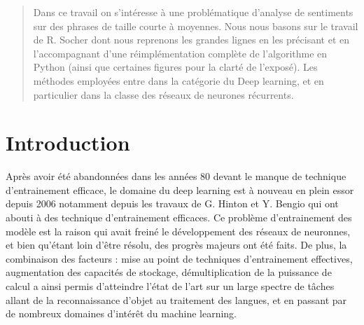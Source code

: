 \documentclass[conference]{IEEEtran}
\begin{document}
\begin{abstract}
Dans ce travail on s'intéresse à une problématique d'analyse de sentiments sur des phrases de taille courte à moyennes. Nous nous basons sur le travail de R. Socher \cite{Socher-etal:2013} dont nous reprenons les grandes lignes en les précisant et en l'accompagnant d'une réimplémentation complète de l'algorithme en Python (ainsi que certaines figures pour la clarté de l'exposé). Les méthodes employées entre dans la catégorie du Deep learning, et en particulier dans la classe des réseaux de neurones récurrents.
\end{abstract}





%
\IEEEpeerreviewmaketitle


\section{Introduction}
Après avoir été abandonnées dans les années 80 devant le manque de technique d'entrainement efficace, le domaine du deep learning est à nouveau en plein essor depuis 2006 notamment depuis les travaux de G. Hinton et Y. Bengio \cite{Hinton:2006:FLA:1161603.1161605,HintonSalakhutdinov2006b,Bengio2007} qui ont abouti à des technique d'entrainement efficaces. Ce problème d'entrainement des modèle est la raison qui avait freiné le développement des réseaux de neuronnes, et bien qu'étant loin d'être résolu, des progrès majeurs ont été faits. De plus, la combinaison des facteurs : mise au point de techniques d'entrainement effectives, augmentation des capacités de stockage, démultiplication de la puissance de calcul a ainsi permis d'atteindre l'état de l'art sur un large spectre de tâches allant de la reconnaissance d'objet au traitement des langues, et en passant par de nombreux domaines d'intérêt du machine learning. 
\end{document}
